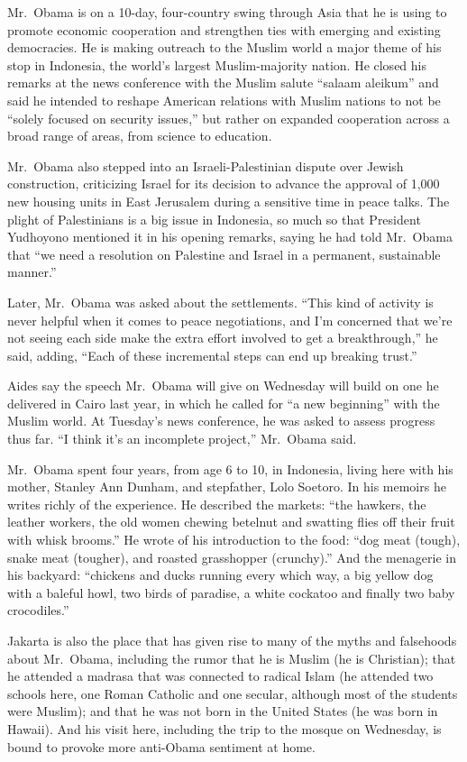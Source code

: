 ﻿\documentclass[12pt]{article}
\begin{document}
Mr.~Obama is on a 10-day, four-country swing through Asia that he is using to promote economic
cooperation and strengthen ties with emerging and existing democracies. He is making outreach to the
Muslim world a major theme of his stop in Indonesia, the world's largest Muslim-majority nation. He
closed his remarks at the news conference with the Muslim salute ``salaam aleikum'' and said he
intended to reshape American relations with Muslim nations to not be ``solely focused on security
issues,'' but rather on expanded cooperation across a broad range of areas, from science to
education.

Mr.~Obama also stepped into an Israeli-Palestinian dispute over Jewish construction, criticizing
Israel for its decision to advance the approval of 1,000 new housing units in East Jerusalem during
a sensitive time in peace talks. The plight of Palestinians is a big issue in Indonesia, so much so
that President Yudhoyono mentioned it in his opening remarks, saying he had told Mr.~Obama that ``we
need a resolution on Palestine and Israel in a permanent, sustainable manner.''

Later, Mr.~Obama was asked about the settlements. ``This kind of activity is never helpful when it
comes to peace negotiations, and I'm concerned that we're not seeing each side make the extra effort
involved to get a breakthrough,'' he said, adding, ``Each of these incremental steps can end up
breaking trust.''

Aides say the speech Mr.~Obama will give on Wednesday will build on one he delivered in Cairo last
year, in which he called for ``a new beginning'' with the Muslim world. At Tuesday's news
conference, he was asked to assess progress thus far. ``I think it's an incomplete project,''
Mr.~Obama said.

Mr.~Obama spent four years, from age 6 to 10, in Indonesia, living here with his mother, Stanley Ann
Dunham, and stepfather, Lolo Soetoro. In his memoirs he writes richly of the experience. He
described the markets: ``the hawkers, the leather workers, the old women chewing betelnut and
swatting flies off their fruit with whisk brooms.'' He wrote of his introduction to the food: ``dog
meat (tough), snake meat (tougher), and roasted grasshopper (crunchy).'' And the menagerie in his
backyard: ``chickens and ducks running every which way, a big yellow dog with a baleful howl, two
birds of paradise, a white cockatoo and finally two baby crocodiles.''

Jakarta is also the place that has given rise to many of the myths and falsehoods about Mr.~Obama,
including the rumor that he is Muslim (he is Christian); that he attended a madrasa that was
connected to radical Islam (he attended two schools here, one Roman Catholic and one secular,
although most of the students were Muslim); and that he was not born in the United States (he was
born in Hawaii). And his visit here, including the trip to the mosque on Wednesday, is bound to
provoke more anti-Obama sentiment at home.
\end{document}
